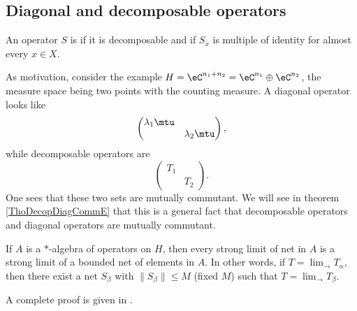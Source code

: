 					\subsection{Diagonal and decomposable operators}



An operator $S$ is  if it is decomposable and if $S_x$ is multiple of identity for almost every $x\in X$.

As motivation, consider the example $H=\eC^{n_1+n_2}=\eC^{n_1}\oplus\eC^{n_2}$, the measure space being two points with the counting measure. A diagonal operator looks like
\begin{equation}
	\begin{pmatrix}
	  \lambda_1\mtu	&		\\ 
		&	\lambda_2\mtu	
	\end{pmatrix},
\end{equation}
while decomposable operators are
\begin{equation}
	\begin{pmatrix}
	 		 T_1	&		\\ 
			&	T_2	
	\end{pmatrix}.
\end{equation}
One sees that these two sets are mutually commutant. We will see in theorem \ref{ThoDecopDiagCommE} that this is a general fact that decomposable operators and diagonal operators are mutually commutant.

\begin{theorem}		\label{ThoKaplanskyDensity}
	If $A$ is a $*$-algebra of operators on $H$, then every strong limit of net in $A$ is a strong limit of a bounded net of elements in $A$. In other words, if $T=\lim_{\rightarrow}T_{\alpha}$, then there exist a net $S_{\beta}$ with $\| S_{\beta} \|\leq M$ (fixed $M$) such that $T=\lim_{\rightarrow}T_{\beta}$.
\end{theorem}

A complete proof is given in \cite{JonesVN}.

